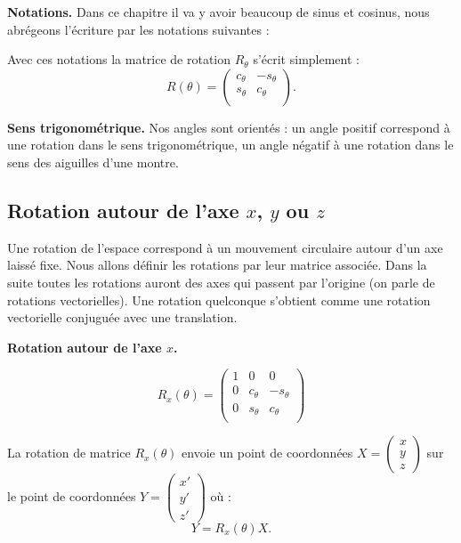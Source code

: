 \documentclass[11pt,class=report,crop=false]{standalone}
\begin{document}
\textbf{Notations.} Dans ce chapitre il va y avoir beaucoup de sinus et cosinus, nous abrégeons l'écriture par les notations suivantes :

Avec ces notations la matrice de rotation $R_\theta$ s'écrit simplement :
$$R(\theta) = 
\begin{pmatrix}
c_\theta  & - s_\theta \\
s_\theta & c_\theta \\
\end{pmatrix}.
$$

\textbf{Sens trigonométrique.}
Nos angles sont orientés : un angle positif correspond à une rotation dans le sens trigonométrique, 
un angle négatif à une rotation dans le sens des aiguilles d'une montre.


\subsection{Rotation autour de l'axe $x$, $y$ ou $z$}

Une rotation de l'espace correspond à un mouvement circulaire autour d'un axe laissé fixe.
Nous allons définir les rotations par leur matrice associée. Dans la suite toutes les rotations auront des axes qui passent par l'origine (on parle de rotations vectorielles).
Une rotation quelconque s'obtient comme une rotation vectorielle conjuguée avec une translation.


\textbf{Rotation autour de l'axe $x$.}

$$R_x(\theta) = 
\begin{pmatrix}
1 & 0 & 0 \\
0 & c_\theta & - s_\theta \\
0 & s_\theta & c_\theta \\
\end{pmatrix}
$$



La rotation de matrice $R_x(\theta)$ envoie un point de coordonnées $X = \left(\begin{smallmatrix} x\\y\\z \end{smallmatrix} \right)$ sur le point de coordonnées $Y = \left(\begin{smallmatrix} x'\\y'\\z' \end{smallmatrix} \right)$ où :
$$Y = R_x(\theta) X.$$
\end{document}
